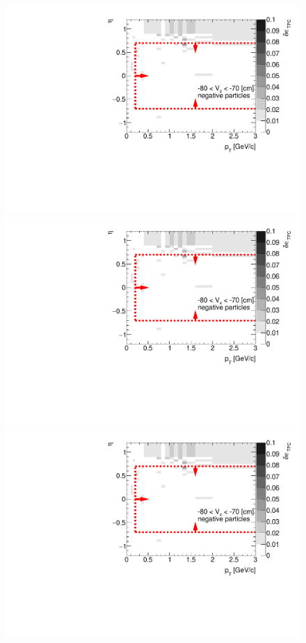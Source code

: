 \begin{figure}[H]
{	}~
	\parbox{0.325\textwidth}{
		\includegraphics[width=\linewidth,page=2]{graphics/systematicsEfficiency/deadMaterial/secondaries_Unbinned_Charged_SDCD.pdf}\\
		\includegraphics[width=\linewidth,page=5]{graphics/systematicsEfficiency/deadMaterial/secondaries_Unbinned_Charged_SDCD.pdf}\\
		\includegraphics[width=\linewidth,page=8]{graphics/systematicsEfficiency/deadMaterial/secondaries_Unbinned_Charged_SDCD.pdf}\\
}
\end{figure}
